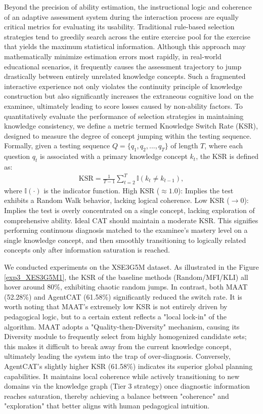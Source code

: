 Beyond the precision of ability estimation, the instructional logic and coherence of an adaptive assessment system during the interaction process are equally critical metrics for evaluating its usability. Traditional rule-based selection strategies tend to greedily search across the entire exercise pool for the exercise that yields the maximum statistical information. Although this approach may mathematically minimize estimation errors most rapidly, in real-world educational scenarios, it frequently causes the assessment trajectory to jump drastically between entirely unrelated knowledge concepts. Such a fragmented interactive experience not only violates the continuity principle of knowledge construction but also significantly increases the extraneous cognitive load on the examinee, ultimately leading to score losses caused by non-ability factors. To quantitatively evaluate the performance of selection strategies in maintaining knowledge consistency, we define a metric termed Knowledge Switch Rate (KSR), designed to measure the degree of concept jumping within the testing sequence. Formally, given a testing sequence $Q = \{q_1, q_2, ..., q_T\}$ of length $T$, where each question $q_t$ is associated with a primary knowledge concept $k_t$, the KSR is defined as:
\begin{align}
    \text{KSR} = \frac{1}{T-1} \sum_{t=2}^{T} \mathbb{I}(k_t \neq k_{t-1}),
\end{align}
where $\mathbb{I}(\cdot)$ is the indicator function. High KSR ($\approx 1.0$): Implies the test exhibits a Random Walk behavior, lacking logical coherence. Low KSR ($\to 0$): Implies the test is overly concentrated on a single concept, lacking exploration of comprehensive ability. Ideal CAT should maintain a moderate KSR. This signifies performing continuous diagnosis matched to the examinee's mastery level on a single knowledge concept, and then smoothly transitioning to logically related concepts only after information saturation is reached.


We conducted experiments on the XSE3G5M dataset. As illustrated in the Figure \ref{exp3_XES3G5M1}, the KSR of the baseline methods (Random/MFI/KLI) all hover around 80\%, exhibiting chaotic random jumps. In contrast, both MAAT (52.28\%) and AgentCAT (61.58\%) significantly reduced the switch rate. It is worth noting that MAAT's extremely low KSR is not entirely driven by pedagogical logic, but to a certain extent reflects a "local lock-in" of the algorithm. MAAT adopts a "Quality-then-Diversity" mechanism, causing its Diversity module to frequently select from highly homogenized candidate sets; this makes it difficult to break away from the current knowledge concept, ultimately leading the system into the trap of over-diagnosis. Conversely, AgentCAT's slightly higher KSR (61.58\%) indicates its superior global planning capabilities. It maintains local coherence while actively transitioning to new domains via the knowledge graph (Tier 3 strategy) once diagnostic information reaches saturation, thereby achieving a balance between "coherence" and "exploration" that better aligns with human pedagogical intuition.
 
 

